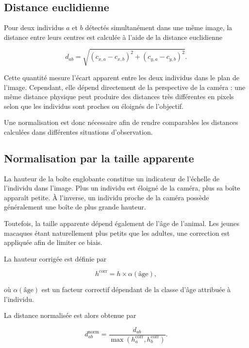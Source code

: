 \documentclass[11pt,a4paper]{report}
\begin{document}
\subsection*{Distance euclidienne}

Pour deux individus $a$ et $b$ détectés simultanément dans une même image, la
distance entre leurs centres est calculée à l'aide de la distance euclidienne

\begin{equation}
d_{ab}
=
\sqrt{
(c_{x,a}-c_{x,b})^2+
(c_{y,a}-c_{y,b})^2
}.
\end{equation}

Cette quantité mesure l'écart apparent entre les deux individus dans le plan de
l'image. Cependant, elle dépend directement de la perspective de la caméra : une
même distance physique peut produire des distances très différentes en pixels
selon que les individus sont proches ou éloignés de l'objectif.

Une normalisation est donc nécessaire afin de rendre comparables les distances
calculées dans différentes situations d'observation.

\subsection*{Normalisation par la taille apparente}

La hauteur de la boîte englobante constitue un indicateur de l'échelle de
l'individu dans l'image. Plus un individu est éloigné de la caméra, plus sa
boîte apparaît petite. À l'inverse, un individu proche de la caméra possède
généralement une boîte de plus grande hauteur.

Toutefois, la taille apparente dépend également de l'âge de l'animal. Les jeunes
macaques étant naturellement plus petits que les adultes, une correction est
appliquée afin de limiter ce biais.

La hauteur corrigée est définie par

\begin{equation}
h^{\mathrm{corr}}
=
h\times\alpha(\text{âge}),
\end{equation}

où $\alpha(\text{âge})$ est un facteur correctif dépendant de la classe d'âge
attribuée à l'individu.

La distance normalisée est alors obtenue par

\begin{equation}
d_{ab}^{\mathrm{norm}}
=
\frac{d_{ab}}
{\max\left(h_a^{\mathrm{corr}},
h_b^{\mathrm{corr}}\right)}.
\end{equation}
\end{document}
